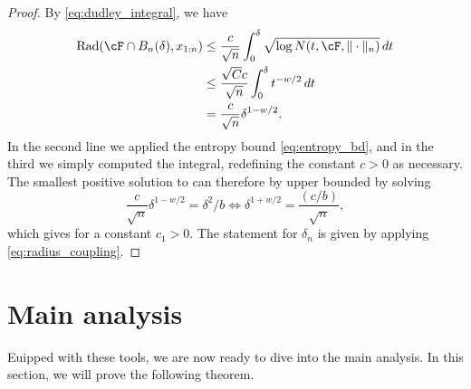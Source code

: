 \documentclass{article}
\begin{document}
\begin{proof}
By \eqref{eq:dudley_integral}, we have
\begin{align*}
\Rad(\cF \cap B_n(\delta), x_{1:n}) &\leq \frac{c}{\sqrt n} \int_0^\delta 
\sqrt{\log N(t, \cF, \|\cdot\|_n)} \, dt \\
&\leq \frac{{\sqrt C} c}{\sqrt n} \int_0^\delta t^{-w/2} \, dt \\ 
&= \frac{c}{\sqrt n} \delta^{1-w/2}.
\end{align*}
In the second line we applied the entropy bound \eqref{eq:entropy_bd}, and in
the third we simply computed the integral, redefining the constant $c>0$ as
necessary. The smallest positive solution  to
 can therefore by upper bounded by
solving 
\[
\frac{c}{\sqrt n} \delta^{1-w/2} = \delta^2 / b \iff \delta^{1+w/2} =
\frac{(c/b)}{\sqrt n}, 
\]
which gives  for a constant
$c_1>0$. The statement for $\delta_n$ is given by applying
\eqref{eq:radius_coupling}.   
\end{proof}

\section{Main analysis} 

Euipped with these tools, we are now ready to dive into the main analysis. In
this section, we will prove the following theorem.   
\end{document}
